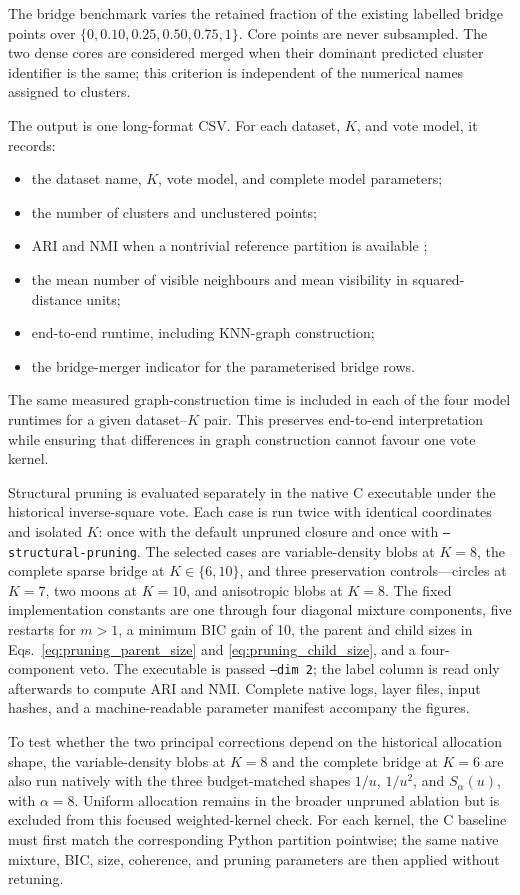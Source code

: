 \documentclass[pdflatex,sn-mathphys-num]{sn-jnl}
\begin{document}
The bridge benchmark varies the retained fraction of the existing labelled bridge points over $\{0,0.10,0.25,0.50,0.75,1\}$. Core points are never subsampled. The two dense cores are considered merged when their dominant predicted cluster identifier is the same; this criterion is independent of the numerical names assigned to clusters.

The output is one long-format CSV. For each dataset, $K$, and vote model, it records:
\begin{itemize}
    \item the dataset name, $K$, vote model, and complete model parameters;
    \item the number of clusters and unclustered points;
    \item ARI and NMI when a nontrivial reference partition is available \citep{HubertArabie1985,VinhEppsBailey2010};
    \item the mean number of visible neighbours and mean visibility in squared-distance units;
    \item end-to-end runtime, including KNN-graph construction;
    \item the bridge-merger indicator for the parameterised bridge rows.
\end{itemize}
The same measured graph-construction time is included in each of the four model runtimes for a given dataset--$K$ pair. This preserves end-to-end interpretation while ensuring that differences in graph construction cannot favour one vote kernel.

Structural pruning is evaluated separately in the native C executable under
the historical inverse-square vote.  Each case is run twice with identical
coordinates and isolated $K$: once with the default unpruned closure and once
with \texttt{--structural-pruning}.  The selected cases are variable-density
blobs at $K=8$, the complete sparse bridge at $K\in\{6,10\}$, and three
preservation controls---circles at $K=7$, two moons at $K=10$, and anisotropic
blobs at $K=8$.  The fixed implementation constants are one through four
diagonal mixture components, five restarts for $m>1$, a minimum BIC gain of
10, the parent and child sizes in Eqs.~\eqref{eq:pruning_parent_size} and
\eqref{eq:pruning_child_size}, and a four-component veto.  The executable is
passed \texttt{--dim 2}; the label column is read only afterwards to compute
ARI and NMI.  Complete native logs, layer files, input hashes, and a
machine-readable parameter manifest accompany the figures.

To test whether the two principal corrections depend on the historical allocation shape,
the variable-density blobs at $K=8$ and the complete bridge at $K=6$ are also
run natively with the three budget-matched shapes $1/u$, $1/u^2$, and
$S_\alpha(u)$, with $\alpha=8$.  Uniform allocation remains in the broader
unpruned ablation but is excluded from this focused weighted-kernel check.  For
each kernel, the C baseline must first match the corresponding Python
partition pointwise; the same native mixture, BIC, size, coherence, and pruning
parameters are then applied without retuning.
\end{document}
